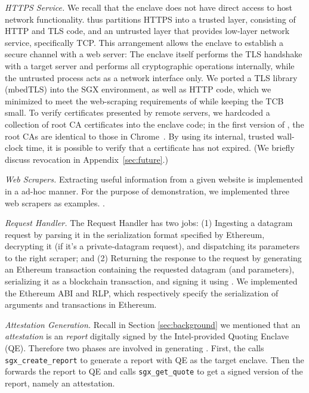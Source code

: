 \vspace{2mm}

\noindent\emph{HTTPS Service.} We recall that the enclave does not have direct
access to host network functionality. \tc thus partitions HTTPS into a trusted
layer, consisting of HTTP and TLS code, and an untrusted layer that provides
low-layer network service, specifically TCP.  This arrangement allows the
enclave to establish a secure channel with a web server: The enclave itself
performs the TLS handshake with a target server and performs all cryptographic
operations internally, while the untrusted process acts as a network interface
only. We ported a TLS library (mbedTLS) into the SGX environment, as well as
HTTP code, which we minimized to meet the web-scraping requirements of \tc while
keeping the TCB small. To verify certificates presented by remote servers, we
hardcoded a collection of root CA certificates into the enclave code; in the
first version of \tc, the root CAs are identical to those in Chrome~\cite{}. By using its internal, trusted wall-clock time, it is possible to verify that a certificate has not expired. (We briefly discuss revocation in Appendix~\ref{sec:future}.)

\vspace{2mm}

\noindent\emph{Web Scrapers.} Extracting useful information from a given website
is implemented in a ad-hoc manner. For the purpose of demonstration, we
implemented three web scrapers as examples. .

\vspace{2mm}

\noindent\emph{Request Handler.} The Request Handler has two jobs: (1) Ingesting
a datagram request by parsing it in the serialization format specified by
Ethereum, decrypting it (if it's a private-datagram request), and dispatching
its parameters to the right scraper; and (2) Returning the response to the
request by generating an Ethereum transaction containing the requested datagram
(and parameters), serializing it as a blockchain transaction, and signing it
using \skTC. We implemented the Ethereum ABI and RLP, which respectively specify
the serialization of arguments and transactions in Ethereum. 

\vspace{2mm}

\noindent\emph{Attestation Generation.} Recall in Section \ref{sec:background}
we mentioned that an \emph{attestation} is an \emph{report} digitally signed by
the Intel-provided Quoting Enclave (QE).  Therefore two phases are involved in
generating \att. First, the \encname calls \texttt{sgx\_create\_report} to
generate a report with QE as the target enclave. Then the \medname forwards the
report to QE and calls \texttt{sgx\_get\_quote} to get a signed version of the
report, namely an attestation.

